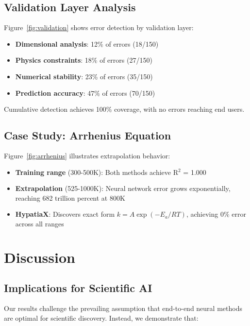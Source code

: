 \documentclass[twoside,11pt]{article}
\begin{document}
\subsection{Validation Layer Analysis}

Figure~\ref{fig:validation} shows error detection by validation layer:

\begin{itemize}
\item \textbf{Dimensional analysis}: 12\% of errors (18/150)
\item \textbf{Physics constraints}: 18\% of errors (27/150)
\item \textbf{Numerical stability}: 23\% of errors (35/150)
\item \textbf{Prediction accuracy}: 47\% of errors (70/150)
\end{itemize}

Cumulative detection achieves 100\% coverage, with no errors reaching end users.

\subsection{Case Study: Arrhenius Equation}

Figure~\ref{fig:arrhenius} illustrates extrapolation behavior:

\begin{itemize}
\item \textbf{Training range} (300-500K): Both methods achieve R$^2$ = 1.000
\item \textbf{Extrapolation} (525-1000K): Neural network error grows exponentially, reaching 682 trillion percent at 800K
\item \textbf{HypatiaX}: Discovers exact form $k = A\exp(-E_a/RT)$, achieving 0\% error across all ranges
\end{itemize}

\section{Discussion}
\label{sec:discussion}

\subsection{Implications for Scientific AI}

Our results challenge the prevailing assumption that end-to-end neural methods are optimal for scientific discovery. Instead, we demonstrate that:
\end{document}
